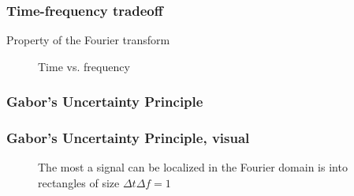 \documentclass{beamer}
\begin{document}
\begin{frame}
	\frametitle{Time-frequency tradeoff}
	Property of the Fourier transform
	\begin{figure}
		\centering
		\hspace{0.2em}
		\caption{Time vs. frequency}
	\end{figure}
\end{frame}

\begin{frame}
	\frametitle{Gabor's Uncertainty Principle}
\end{frame}

\begin{frame}
	\frametitle{Gabor's Uncertainty Principle, visual}
	\begin{figure}
		\centering
		\hspace{0.35em}
		\caption{The most a signal can be localized in the Fourier domain is into rectangles of size $\Delta t\Delta f = 1$}
	\end{figure}
\end{frame}
\end{document}
